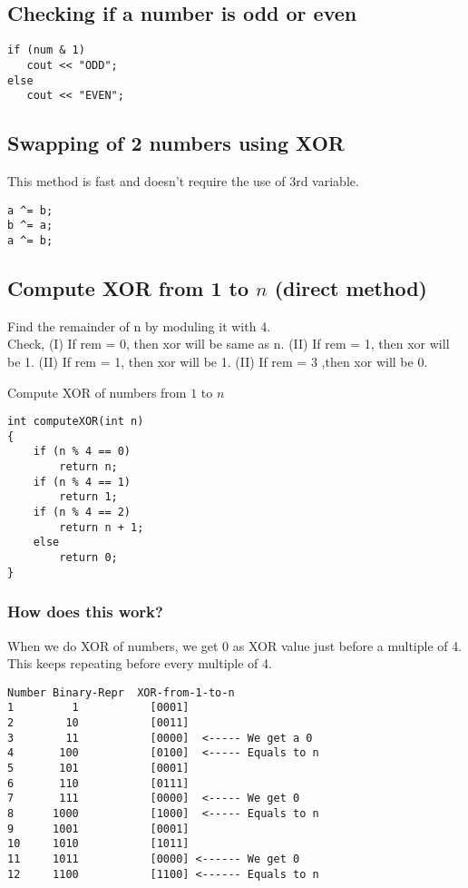 \documentclass[twoside,12pt,a4paper,english]{book}
\theoremstyle{definition}
\theoremstyle{problemstyle}
\begin{document}
\subsection{Checking if a number is odd or even}
\begin{lstlisting}
if (num & 1)
   cout << "ODD";
else
   cout << "EVEN";
\end{lstlisting}
\subsection{Swapping of 2 numbers using XOR}
This method is fast and doesn’t require the use of 3rd variable.
\begin{lstlisting}
a ^= b;
b ^= a;
a ^= b;
\end{lstlisting}
\newpage
\subsection{Compute XOR from 1 to $n$ (direct method)}
\begin{algorithm}
Find the remainder of n by moduling it with 4.\\
Check, \linebreak
 (I) If rem = 0, then xor will be same as n.
\linebreak
(II) If rem = 1, then xor will be 1.
\linebreak
(II) If rem = 1, then xor will be 1.
\linebreak
(II) If rem = 3 ,then xor will be 0.
\caption{Compute XOR of numbers from $1$ to $n$}
\label{algo:b}
\end{algorithm}
\begin{lstlisting}
int computeXOR(int n)
{
    if (n % 4 == 0)
        return n;
    if (n % 4 == 1)
        return 1;
    if (n % 4 == 2)
        return n + 1;
    else
        return 0;
}
\end{lstlisting}
\subsubsection{How does this work?}
When we do XOR of numbers, we get 0 as XOR value just before a multiple of 4. This keeps repeating before every multiple of 4.
\begin{lstlisting}
Number Binary-Repr  XOR-from-1-to-n
1         1           [0001]
2        10           [0011]
3        11           [0000]  <----- We get a 0
4       100           [0100]  <----- Equals to n
5       101           [0001]
6       110           [0111]
7       111           [0000]  <----- We get 0
8      1000           [1000]  <----- Equals to n
9      1001           [0001]
10     1010           [1011]
11     1011           [0000] <------ We get 0
12     1100           [1100] <------ Equals to n
\end{lstlisting}
\newpage
\end{document}
